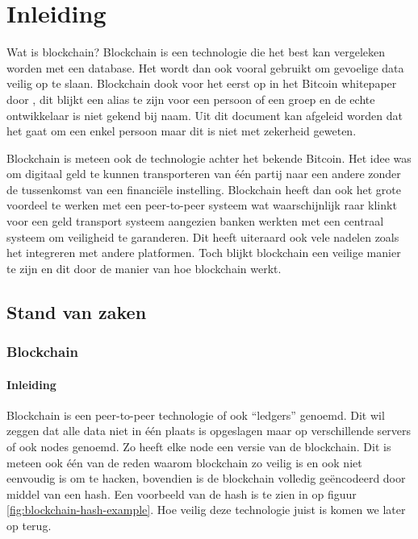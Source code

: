 
\chapter{Inleiding}
\label{ch:inleiding}

Wat is blockchain? Blockchain is een technologie die het best kan vergeleken worden met een database. Het wordt dan ook vooral gebruikt om gevoelige data veilig op te slaan. Blockchain dook voor het eerst op in het Bitcoin whitepaper door \textcite{Nakamoto2008}, dit blijkt een alias te zijn voor een persoon of een groep en de echte ontwikkelaar is niet gekend bij naam. Uit dit document kan afgeleid worden dat het gaat om een enkel persoon maar dit is niet met zekerheid geweten.

Blockchain is meteen ook de technologie achter het bekende Bitcoin. Het idee was om digitaal geld te kunnen transporteren van één partij naar een andere zonder de tussenkomst van een financiële instelling. Blockchain heeft dan ook het grote voordeel te werken met een peer-to-peer systeem wat waarschijnlijk raar klinkt voor een geld transport systeem aangezien banken werkten met een centraal systeem om veiligheid te garanderen. Dit heeft uiteraard ook vele nadelen zoals het integreren met andere platformen. Toch blijkt blockchain een veilige manier te zijn en dit door de manier van hoe blockchain werkt.

\section{Stand van zaken}
\label{sec:stand-van-zaken}


\subsection{Blockchain}
\subsubsection{Inleiding}
 Blockchain is een peer-to-peer technologie of ook ``ledgers'' genoemd. Dit wil zeggen dat alle data niet in één plaats is opgeslagen maar op verschillende servers of ook nodes genoemd. Zo heeft elke node een versie van de blockchain. Dit is meteen ook één van de reden waarom blockchain zo veilig is en ook niet eenvoudig is om te hacken, bovendien is de blockchain volledig geëncodeerd door middel van een hash. Een voorbeeld van de hash is te zien in op figuur \ref{fig:blockchain-hash-example}. Hoe veilig deze technologie juist is komen we later op terug.
 
